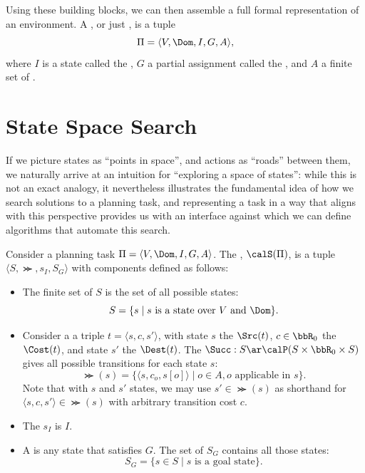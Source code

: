 Using these building blocks, we can then assemble a full formal representation of an environment. A , or just , is a tuple $$\Pi=\langle V,\Dom,I,G,A\rangle,$$ where $I$ is a state called the , $G$ a partial assignment called the , and $A$ a finite set of .


\section{State Space Search}

If we picture states as ``points in space'', and actions as ``roads'' between them, we naturally arrive at an intuition for ``exploring a space of states'': while this is not an exact analogy, it nevertheless illustrates the fundamental idea of how we search solutions to a planning task, and representing a task in a way that aligns with this perspective provides us with an interface against which we can define algorithms that automate this search.

Consider a planning task $\Pi=\langle V,\Dom,I,G,A\rangle$. The , $\calS(\Pi)$, is a tuple $\langle S,\Succ,s_I,S_G\rangle$ with components defined as follows:

\begin{itemize}
    \item The finite set of  $S$ is the set of all possible states: $$S=\{s\mid s\text{ is a state over }V\text{ and }\Dom\}.$$
    \item Consider a  a triple $t=\langle s,c,s'\rangle$, with state $s$ the  $\Src(t)$, $c\in\bbR_0$ the  $\Cost(t)$, and state $s'$ the  $\Dest(t)$. The  $\Succ:S\ar\calP(S\times\bbR_0\times S)$ gives all possible transitions for each state $s$: $$\Succ(s)=\{\langle s,c_o,s[o]\rangle\mid o\in A, o\text{ applicable in }s\}.$$ Note that with $s$ and $s'$ states, we may use $s'\in\Succ(s)$ as shorthand for $\langle s,c,s'\rangle\in\Succ(s)$ with arbitrary transition cost $c$.
    \item The  $s_I$ is $I$.
    \item A  is any state that satisfies $G$. The set of  $S_G$ contains all those states: $$S_G=\{s\in S\mid s\text{ is a goal state}\}.$$
\end{itemize}

